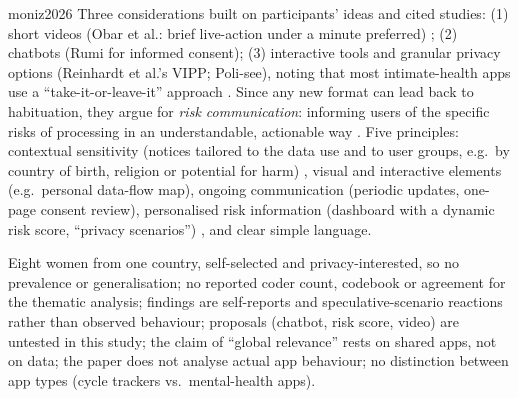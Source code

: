 \begin{papercard}{moniz2026}
 Three considerations built on participants' ideas and cited studies: (1) short videos (Obar et al.: brief live-action under a minute preferred) ; (2) chatbots (Rumi for informed consent); (3) interactive tools and granular privacy options (Reinhardt et al.'s VIPP; Poli-see), noting that most intimate-health apps use a ``take-it-or-leave-it'' approach . Since any new format can lead back to habituation, they argue for \emph{risk communication}: informing users of the specific risks of processing in an understandable, actionable way . Five principles: contextual sensitivity (notices tailored to the data use and to user groups, e.g.\ by country of birth, religion or potential for harm) , visual and interactive elements (e.g.\ personal data-flow map), ongoing communication (periodic updates, one-page consent review), personalised risk information (dashboard with a dynamic risk score, ``privacy scenarios'') , and clear simple language.

 Eight women from one country, self-selected and privacy-interested, so no prevalence or generalisation; no reported coder count, codebook or agreement for the thematic analysis; findings are self-reports and speculative-scenario reactions rather than observed behaviour; proposals (chatbot, risk score, video) are untested in this study; the claim of ``global relevance'' rests on shared apps, not on data; the paper does not analyse actual app behaviour; no distinction between app types (cycle trackers vs.\ mental-health apps).


\end{papercard}
